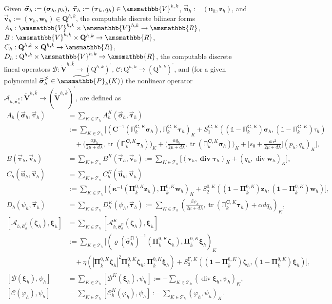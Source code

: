 \documentclass[fleqn,a4paper]{cas-sc}
\newcommand\vdiv{\mathop{\mathrm{div}}\nolimits}
\newcommand\bdiv{\mathop{\mathbf{div}}\nolimits}
\newcommand\tr{\mathop{\mathrm{tr}}\nolimits}
\newcommand{\bC}{\mathbf{C}}
\newcommand{\bbR}{\amsmathbb{R}}
\newcommand\RR{\bbR}
\newcommand{\bu}{\boldsymbol{u}}
\newcommand{\bv}{\boldsymbol{v}}
\newcommand{\bw}{\boldsymbol{w}}
\newcommand{\bz}{\boldsymbol{z}}
\newcommand{\bkappa}{\boldsymbol{\kappa}}
\newcommand{\bxi}{\boldsymbol{\xi}}
\newcommand{\bzeta}{\boldsymbol{\zeta}}
\newcommand{\bPi}{\boldsymbol{\Pi}}
\newcommand{\0}{\boldsymbol{0}}
\newcommand\cA{\mathcal{A}}
\newcommand\cB{\mathcal{B}}
\newcommand\cC{\mathcal{C}}
\newcommand\cT{\mathcal{T}}
\newcommand\bQ{\mathbf{Q}}
\newcommand\bV{\mathbf{V}}
\newcommand\rQ{\mathrm{Q}}
\newcommand\bbV{\amsmathbb{V}}
\newcommand\bbP{\amsmathbb{P}}
\newcommand\rF{\mathrm{F}}
\newcommand\bbPi{\mathbb{\Pi}}
\newcommand\bOne{\mathbf{1}}
\newcommand\bbOne{\mathbb{1}}
\newcommand\bsigma{\boldsymbol{\sigma}}
\newcommand\btau{\boldsymbol{\tau}}
\numberwithin{equation}{section}
\numberwithin{figure}{section}
\begin{document}
Given $\vec{\bsigma}_h := (\bsigma_h, p_h), \  \vec{\btau}_h := (\btau_h, q_h) \in \bbV^{h,k}$,  $\vec{\bu}_h := (\bu_h, \bz_h)$, and $\vec{\bv}_h := (\bv_h, \bw_h) \in \bQ^{h,k}$, the computable discrete bilinear forms $A_h:\bbV^{h,k}\times\bbV^{h,k}\to\RR$, $B:\bbV^{h,k}\times\bQ^{h,k}\to\RR$, $C_h:\bQ^{h,k}\times\bQ^{h,k}\to\RR$, $D_h:\rQ^{h,k}\times\bbV^{h,k}\to\RR$,  
the computable discrete lineal operators $\cB:  \widetilde{\bV}^{h,\overline{k}} \to (\rQ^{h,k})^\prime$, $\cC:\rQ^{h,k}\to (\rQ^{h,k})^\prime$, and (for a given polynomial $\widehat{\bsigma}_h^{\bbPi}\in \widetilde{\bbP}_{k}(K)$) the nonlinear operator $\cA_{h,\widehat{\bsigma}_h^{\bbPi}}:\widetilde{\bV}^{h,\overline{k}}\to (\widetilde{\bV}^{h,\overline{k}})^{\prime}$, are defined as 
\begin{align*}
    A_h(\vec{\bsigma}_h, \vec{\btau}_h) &= \sum_{K\in \cT_h} A_h^K(\vec{\bsigma}_h, \vec{\btau}_h) \\
    &:=  \sum_{K\in \cT_h} \biggl[ (\bC^{-1}(\bbPi_{k}^{\bC,K}\bsigma_h), \bbPi_{k}^{\bC,K}\btau_h)_K + S_1^{\bC,K}((\bbOne-\bbPi_{k}^{\bC,K})\bsigma_h,(\bbOne-\bbPi_{k}^{\bC,K})\tau_h) \\
    &\quad + \bigl(\frac{\alpha p_h}{2\mu + d\lambda}, \tr(\bbPi_{k}^{\bC,K}\btau_h) \bigr)_K + \bigl(\frac{\alpha q_h}{2\mu + d\lambda}, \tr(\bbPi_{k}^{\bC,K}\bsigma_h) \bigr)_K + \bigl[s_0+\frac{d\alpha^2}{2\mu + d\lambda}\bigr] (p_h,q_h)_K\biggr],\\
    B(\vec{\btau}_h, \vec{\bv}_h) &= \sum_{K\in \cT_h} B^K(\vec{\btau}_h, \vec{\bv}_h) := \sum_{K\in \cT_h} \biggl[(\bv_h, \bdiv \btau_h)_K + (q_h , \vdiv \bw_h)_K \biggr], \\ 
    C_h(\vec{\bu}_h, \vec{\bv}_h) &= \sum_{K\in \cT_h}C_h^K(\vec{\bu}_h, \vec{\bv}_h) \\
    &:= \sum_{K\in \cT_h} \biggl[(\bkappa^{-1}(\bPi_{\overline{k}}^{0,K}\bz_h),\bPi_{\overline{k}}^{0,K}\bw_h)_K + S_2^{0,K}((\bOne-\bPi_{\overline{k}}^{0,K})\bz_h,(\bOne-\bPi_{\overline{k}}^{0,K})\bw_h)\biggr], \\ 
    D_h(\psi_h,\vec{\btau}_h) &= \sum_{K\in \cT_h} D_h^{K}(\psi_h,\vec{\btau}_h) := \sum_{K\in \cT_h} (\frac{\beta \psi_h}{2\mu + d\lambda}, \tr(\bbPi_{k}^{\bC,K}\btau_h) + \alpha d q_h )_K , \\
    [\cA_{h,\widehat{\bsigma}_h^{\bbPi}}(\bzeta_h),\bxi_h] &= \sum_{K\in \cT_h} [\cA_{h,\widehat{\bsigma}_h^{\bbPi}}^K(\bzeta_h),\bxi_h]\\
    &:= \sum_{K\in \cT_h} \biggl[ (\varrho(\widehat{\bsigma}_h^{\bbPi})^{-1}(\bPi_{\overline{k}}^{0,K}\bzeta_h),\bPi_{\overline{k}}^{0,K}\bxi_h)_K \\
    &\quad + \eta(|\bPi_{\overline{k}}^{0,K}\bzeta_h|^{2}\bPi_{\overline{k}}^{0,K}\bzeta_h, \bPi_{\overline{k}}^{0,K}\bxi_h) + S_3^{\rF,K}((\bOne - \bPi_{\overline{k}}^{0,K})\bzeta_h,(\bOne - \bPi_{\overline{k}}^{0,K})\bxi_h)\biggr], \\
    {[\cB(\bxi_h), \psi_h]} &{= \sum_{K\in \cT_h} [\cB^K(\bxi_h), \psi_h] := -\sum_{K\in \cT_h} (\vdiv \bxi_h, \psi_h)_K,} \\
    {[\cC(\varphi_h), \psi_h]} &{= \sum_{K\in \cT_h} [\cC_h^K(\varphi_h), \psi_h] := \sum_{K\in \cT_h} (\varphi_h, \psi_h)_K.}
\end{align*}
\end{document}
